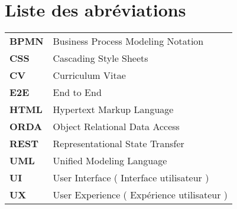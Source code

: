 \chapter*{Liste des abréviations}

\begin{spacing}{1.5}
    
\begin{tabular}{l  l}    
    \textbf{BPMN} & Business Process Modeling Notation \\
    \textbf{CSS} & Cascading Style Sheets \\
    \textbf{CV} & Curriculum Vitae \\
    \textbf{E2E} & End to End \\
    \textbf{HTML} & Hypertext Markup Language \\ 
    \textbf{ORDA} & Object Relational Data Access \\
    \textbf{REST} & Representational State Transfer \\
    \textbf{UML} & Unified Modeling Language \\
    \textbf{UI} & User Interface ( Interface utilisateur ) \\    
    \textbf{UX} & User Experience ( Expérience utilisateur ) \\
    
\end{tabular}
\end{spacing}
